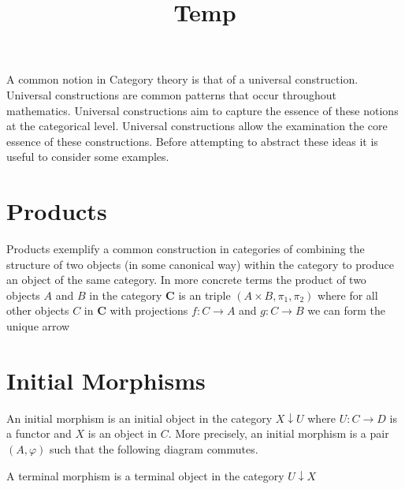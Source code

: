 \documentclass[a4paper,10pt]{article}
\title{Temp}
\begin{document}
\maketitle
A common notion in Category theory is that of a universal construction. Universal constructions are common patterns that occur throughout mathematics. Universal constructions aim to capture the essence of these notions at the categorical level. Universal constructions allow the examination the core essence of these constructions. Before attempting to abstract these ideas it is useful to consider some examples.
\section{Products}
Products exemplify a common construction in categories of combining the structure of two objects (in some canonical way) within the category to produce an object of the same category. In more concrete terms the product of two objects $A$ and $B$ in the category $\textbf{C}$ is an triple $(A \times B, \pi_{1}, \pi_{2})$ where for all other objects $C$ in $\textbf{C}$ with projections $f: C \rightarrow A$ and $g: C \rightarrow B$ we can form the unique arrow 


\section{Initial Morphisms}
An initial morphism is an initial object in the category $X \downarrow U$ where $U : C \rightarrow D$ is a functor and $X$ is an object in $C$. More precisely, an initial morphism is a pair $(A, \varphi)$ such that the following diagram commutes.

A terminal morphism is a terminal object in the category $U \downarrow X$

\end{document}
